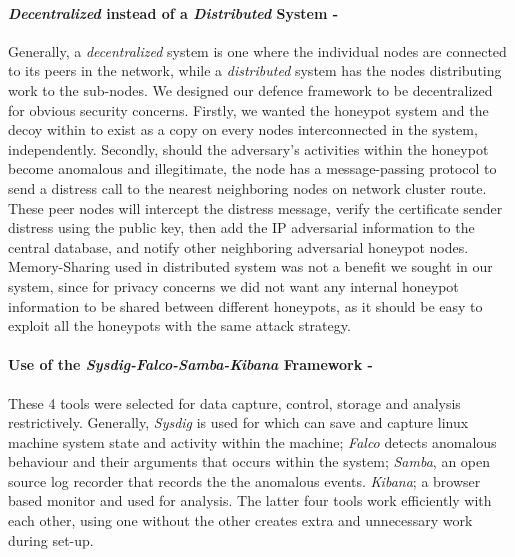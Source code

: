 \documentclass[grad,lot,lof,11pt,oneside,onehalfspace]{RUthesis}
\begin{document}
\paragraph{\textit{Decentralized} instead of a \textit{Distributed} System -} Generally, a \textit{decentralized } system is one where the individual nodes are connected to its peers in the network, while a \textit{distributed} system has the nodes distributing work to the sub-nodes. We designed our defence framework to be decentralized for obvious security concerns. Firstly, we wanted the honeypot system and the decoy within to exist as a copy on every nodes interconnected in the system, independently. Secondly, should the adversary's activities within the honeypot become anomalous and illegitimate, the node has a message-passing protocol to send a distress call to the nearest neighboring nodes on network cluster route. These peer nodes will intercept the distress message, verify the certificate sender distress using the public key, then add the IP adversarial information to the central database, and notify other neighboring adversarial honeypot nodes. Memory-Sharing used in distributed system was not a benefit we sought in our system, since for privacy concerns we did not want any internal honeypot information to be shared between different honeypots, as it should be easy to exploit all the honeypots with the same attack strategy. 
\paragraph{Use of the \textit{Sysdig-Falco-Samba-Kibana} Framework -} These 4 tools were selected for data capture, control, storage and analysis restrictively. Generally, \textit{Sysdig} is used for which can save and capture linux machine system state and activity within the machine; \textit{Falco} detects anomalous behaviour and their arguments that occurs within the system; \textit{Samba}, an open source log recorder that records the the anomalous events. \textit{Kibana}; a browser based monitor and used for analysis. The latter four tools work efficiently with each other, using one without the other creates extra and unnecessary work during set-up. 

 
\end{document}
